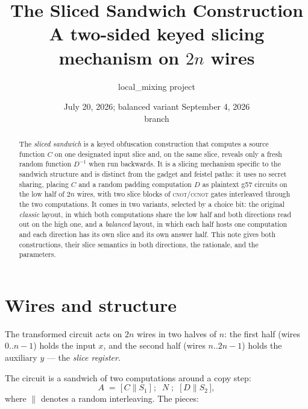 \documentclass[11pt]{article}
\title{\textbf{The Sliced Sandwich Construction}\\[2pt]
\large A two-sided keyed slicing mechanism on $2n$ wires}
\author{local\_mixing project}
\date{July 20, 2026; balanced variant September 4, 2026 \\
\small branch \code{ssg-gen-mix-clean}}
\newcommand{\CNOT}{\textsc{cnot}}
\newcommand{\CCNOT}{\textsc{ccnot}}
\begin{document}
\maketitle

\begin{abstract}
\noindent The \emph{sliced sandwich} is a keyed obfuscation construction that
computes a source function $C$ on one designated input slice and, on the same
slice, reveals only a fresh random function $D^{-1}$ when run backwards. It is
a slicing mechanism specific to the sandwich structure and is distinct from
the gadget and feistel paths: it uses no secret sharing, placing $C$ and a
random padding computation $D$ as plaintext g57 circuits on the low half of
$2n$ wires, with two slice blocks of \CNOT/\CCNOT{} gates interleaved through
the two computations. It comes in two variants, selected by a choice bit: the
original \emph{classic} layout, in which both computations share the low half
and both directions read out on the high one, and a \emph{balanced} layout, in
which each half hosts one computation and each direction has its own slice and
its own answer half. This note gives both constructions, their slice semantics
in both directions, the rationale, and the parameters.
\end{abstract}

\section{Wires and structure}

The transformed circuit acts on $2n$ wires in two halves of $n$:
the first half (wires $0..n{-}1$) holds the input $x$, and the second half
(wires $n..2n{-}1$) holds the auxiliary $y$ --- the \emph{slice register}.

The circuit is a sandwich of two computations around a copy step:
\[
A \;=\; \bigl[\, C \parallel S_1 \,\bigr]\;;\;\; N \;;\;\; \bigl[\, D \parallel S_2 \,\bigr],
\]
where $\parallel$ denotes a random interleaving. The pieces:
\end{document}
